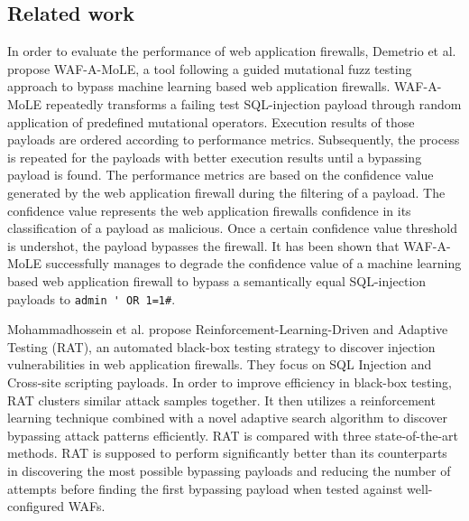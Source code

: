 \subsection{Related work}
In order to evaluate the performance of web application firewalls, Demetrio et al. \cite{rw/demetrio} propose WAF-A-MoLE, a tool following a guided mutational fuzz testing approach to bypass machine learning based web application firewalls. WAF-A-MoLE repeatedly transforms a failing test SQL-injection payload through random application of predefined mutational operators. Execution results of those payloads are ordered according to performance metrics. Subsequently, the process is repeated for the payloads with better execution results until a bypassing payload is found. The performance metrics are based on the confidence value generated by the web application firewall during the filtering of a payload. The confidence value represents the web application firewalls confidence in its classification of a payload as malicious. Once a certain confidence value threshold is undershot, the payload bypasses the firewall. It has been shown that WAF-A-MoLE successfully manages to degrade the confidence value of a machine learning based web application firewall to bypass a semantically equal SQL-injection payloads to \verb|admin ' OR 1=1#|.

Mohammadhossein et al. \cite{rw/mohammad} propose Reinforcement-Learning-Driven and Adaptive Testing (RAT), an automated black-box testing strategy to discover injection vulnerabilities in web application firewalls. They focus on SQL Injection and Cross-site scripting payloads. In order to improve efficiency in black-box testing, RAT clusters similar attack samples together. It then utilizes a reinforcement learning technique combined with a novel adaptive search algorithm to discover bypassing attack patterns efficiently. RAT is compared with three state-of-the-art methods. RAT is supposed to perform significantly better than its counterparts in discovering the most possible bypassing payloads and reducing the number of attempts before finding the first bypassing payload when tested against well-configured WAFs.

